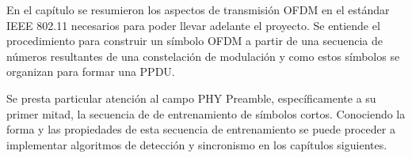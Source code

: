 En el capítulo se resumieron los aspectos de transmisión OFDM en el estándar IEEE 802.11 necesarios para poder llevar adelante el proyecto. Se entiende el procedimiento para construir un símbolo OFDM a partir de una secuencia de números resultantes de una constelación de modulación y como estos símbolos se organizan para formar una PPDU.

Se presta particular atención al campo PHY Preamble, específicamente a su primer mitad, la secuencia de de entrenamiento de símbolos cortos. Conociendo la forma y las propiedades de esta secuencia de entrenamiento se puede proceder a implementar algoritmos de detección y sincronismo en los capítulos siguientes.

